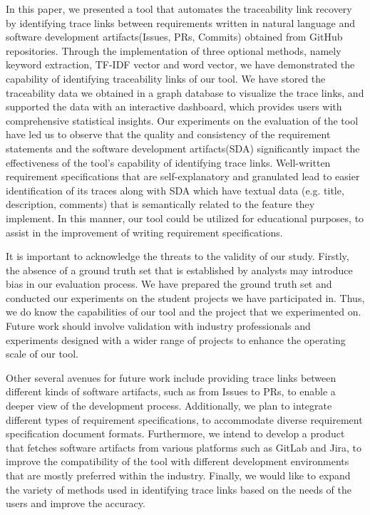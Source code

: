 \documentclass[conference]{IEEEtran}
\begin{document}

In this paper, we presented a tool that automates the traceability link recovery by identifying trace links between requirements written in natural language and software development artifacts(Issues, PRs, Commits) obtained from GitHub repositories. Through the implementation of three optional methods, namely keyword extraction, TF-IDF vector and word vector, we have demonstrated the capability of identifying traceability links of our tool. We have stored the traceability data we obtained in a graph database to visualize the trace links, and supported the data with an interactive dashboard, which provides users with comprehensive statistical insights.
Our experiments on the evaluation of the tool have led us to observe that the quality and consistency of the requirement statements and the software development artifacts(SDA) significantly impact the effectiveness of the tool's capability of identifying trace links. Well-written requirement specifications that are self-explanatory and granulated lead to easier identification of its traces along with SDA which have textual data (e.g. title, description, comments) that is semantically related to the feature they implement. In this manner, our tool could be utilized for educational purposes, to assist in the improvement of writing requirement specifications.

It is important to acknowledge the threats to the validity of our study. Firstly, the absence of a ground truth set that is established by analysts may introduce bias in our evaluation process. We have prepared the ground truth set and conducted our experiments on the student projects we have participated in. Thus, we do know the capabilities of our tool and the project that we experimented on. Future work should involve validation with industry professionals and experiments designed with a wider range of projects to enhance the operating scale of our tool. 

Other several avenues for future work include providing trace links between different kinds of software artifacts, such as from Issues to PRs, to enable a deeper view of the development process. Additionally, we plan to integrate different types of requirement specifications, to accommodate diverse requirement specification document formats. Furthermore, we intend to develop a product that fetches software artifacts from various platforms such as GitLab and Jira, to improve the compatibility of the tool with different development environments that are mostly preferred within the industry. Finally, we would like to expand the variety of methods used in identifying trace links based on the needs of the users and improve the accuracy.
\end{document}
